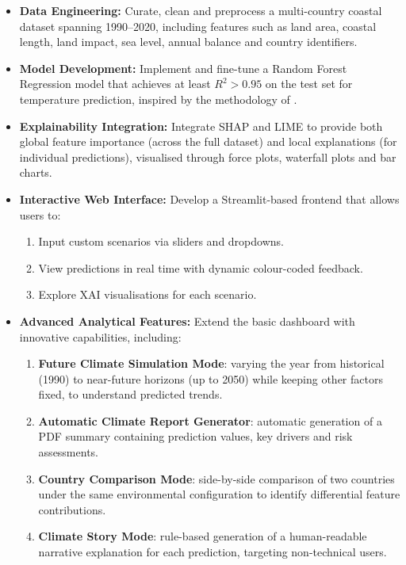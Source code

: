 \documentclass[12pt, a4paper]{article}
\begin{document}
\begin{itemize}
  \item \textbf{Data Engineering:} Curate, clean and preprocess a
  multi-country coastal dataset spanning 1990–2020, including
  features such as land area, coastal length, land impact, sea level,
  annual balance and country identifiers.
  \item \textbf{Model Development:} Implement and fine-tune a Random
  Forest Regression model that achieves at least \mbox{$R^2 > 0.95$} on the
  test set for temperature prediction, inspired by the methodology of
  \cite{wang2024}.
  \item \textbf{Explainability Integration:} Integrate SHAP and LIME
  to provide both global feature importance (across the full dataset)
  and local explanations (for individual predictions), visualised
  through force plots, waterfall plots and bar charts.
  \item \textbf{Interactive Web Interface:} Develop a Streamlit-based
  frontend that allows users to:
  \begin{enumerate}[label=\roman*)]
    \item Input custom scenarios via sliders and dropdowns.
    \item View predictions in real time with dynamic colour-coded
    feedback.
    \item Explore XAI visualisations for each scenario.
  \end{enumerate}
  \item \textbf{Advanced Analytical Features:} Extend the basic dashboard
  with innovative capabilities, including:
  \begin{enumerate}[label=\roman*)]
    \item \textbf{Future Climate Simulation Mode}: varying the year
    from historical (1990) to near-future horizons (up to 2050)
    while keeping other factors fixed, to understand predicted
    trends.
    \item \textbf{Automatic Climate Report Generator}: automatic
    generation of a PDF summary containing prediction values,
    key drivers and risk assessments.
    \item \textbf{Country Comparison Mode}: side-by-side comparison of
    two countries under the same environmental configuration to
    identify differential feature contributions.
    \item \textbf{Climate Story Mode}: rule-based generation of a
    human-readable narrative explanation for each prediction,
    targeting non-technical users.
  \end{enumerate}
\end{itemize}
\end{document}
